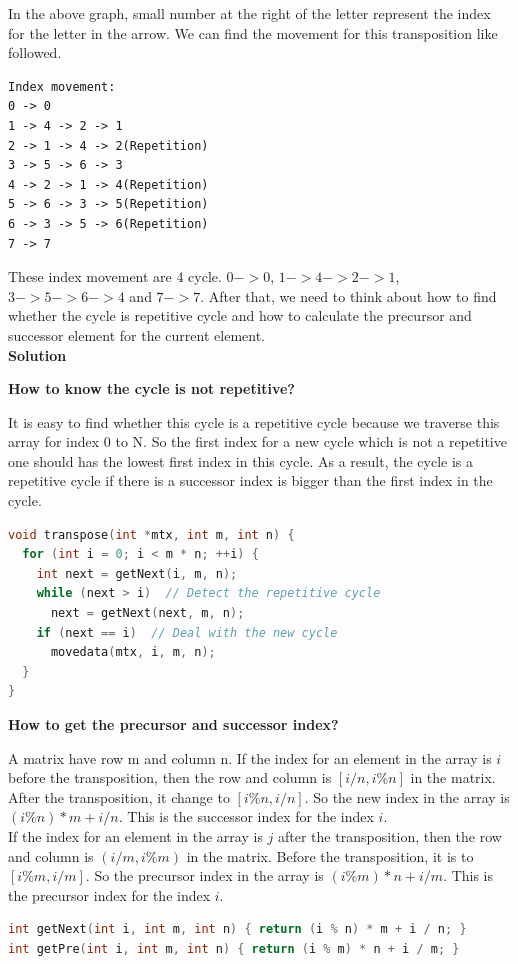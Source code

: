 \begin{homeworkProblem}
In the above graph, small number at the right of the letter represent the index for the letter in the arrow. We can find the movement for this transposition like followed.
\begin{lstlisting}
Index movement:
0 -> 0
1 -> 4 -> 2 -> 1
2 -> 1 -> 4 -> 2(Repetition)
3 -> 5 -> 6 -> 3
4 -> 2 -> 1 -> 4(Repetition)
5 -> 6 -> 3 -> 5(Repetition)
6 -> 3 -> 5 -> 6(Repetition)
7 -> 7
\end{lstlisting}
These index movement are 4 cycle. $0->0$,  $1 -> 4 -> 2 -> 1$, $3 -> 5 -> 6 -> 4$ and $7 -> 7$. After that, we need to think about how to find whether the cycle is repetitive cycle and how to calculate the precursor and successor element for the current element. \\

\textbf{Solution}

\textbf{How to know the cycle is not repetitive?}

It is easy to find whether this cycle is a repetitive cycle because we traverse this array for index 0 to N. So the first index for a new cycle which is not a repetitive one should has the lowest first index in this cycle. As a result, the cycle is a repetitive cycle if there is a successor index is bigger than the first index in the cycle. 
\begin{lstlisting}[language=C++]
void transpose(int *mtx, int m, int n) {
  for (int i = 0; i < m * n; ++i) {
    int next = getNext(i, m, n);
    while (next > i)  // Detect the repetitive cycle
      next = getNext(next, m, n);
    if (next == i)  // Deal with the new cycle
      movedata(mtx, i, m, n);
  }
}
\end{lstlisting}

\textbf{How to get the precursor and successor index?}

A matrix have row m and column n. If the index for an element in the array is $i$ before the transposition, then the row and column is $[i/n, i\%n]$ in the matrix. After the transposition, it change to $[i\%n,i/n]$. So the new index in the array is $(i\%n)*m + i/n$. This is the successor index for the index $i$. \\

If the index for an element in the array is $j$ after the transposition, then the row and column is $(i/m, i\%m)$ in the matrix. Before the transposition, it is to $[i\%m,i/m]$. So the precursor index in the array is $(i\%m)*n + i/m$. This is the precursor index for the index $i$.

\begin{lstlisting}[language=C++]
int getNext(int i, int m, int n) { return (i % n) * m + i / n; }
int getPre(int i, int m, int n) { return (i % m) * n + i / m; }
\end{lstlisting}


\end{homeworkProblem}
